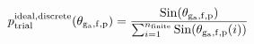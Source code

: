 \documentclass[12pt]{article}
\begin{document}
\begin{displaymath}
p_{\rm trial}^{\rm ideal,discrete}(\theta_{\rm g_a,f,p}) =
{
 {{\rm Sin}(\theta_{\rm g_a,f,p})}
\over{\sum_{i=1}^{n_{\rm finite}} {{\rm Sin}(\theta_{\rm g_a,f,p}(i))} }
}
\end{displaymath}
\end{document}
